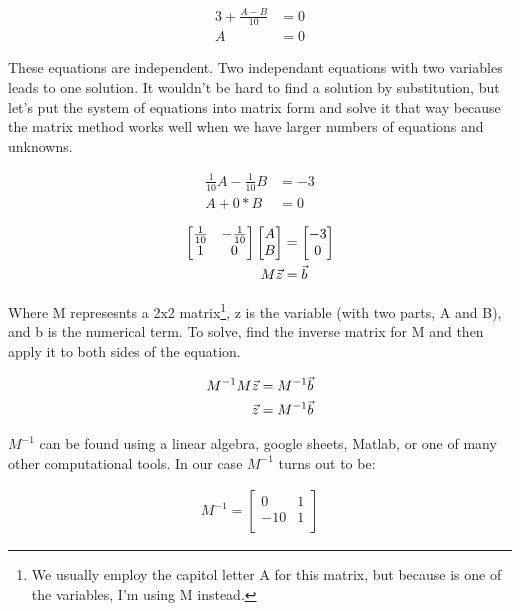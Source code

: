 \begin{align}
3 + \frac{A-B}{10}&=0\tag{Node B}\\
A&=0 \tag{Assign reference node}
\end{align} 

These equations are independent. Two independant equations with two variables leads to one solution. It wouldn't be hard to find a solution by substitution, but let's put the system of equations into matrix form and solve it that way because the matrix method works well when we have larger numbers of equations and unknowns.

\begin{align*}
\frac{1}{10}A-\frac{1}{10}B&=-3\\
A+0*B&=0
\end{align*}

\begin{align}
\left[ \begin{matrix}
\frac{1}{10} &	-\frac{1}{10}\\
1		&	0 \\
\end{matrix} \right]
\left[ \begin{matrix} A\\B\\ \end{matrix} \right]
&=
\left[ \begin{matrix}-3\\0\\\end{matrix} \right] \notag \\
M\vec{z}&=\vec{b}
\end{align} 

Where M represesnts a 2x2 matrix\footnote{We usually employ the capitol letter A for this matrix, but because is one of the variables, I'm using M instead.}, z is the variable (with two parts, A and B), and b is the numerical term. To solve, find the inverse matrix for M and then apply it to both sides of the equation.

\begin{align}
M^{-1}M\vec{z}=M^{-1}\vec{b} \notag\\
\vec{z} = M^{-1}\vec{b}
\end{align} 

$M^{-1}$ can be found using a linear algebra, google sheets, Matlab, or one of many other computational tools. In our case $M^{-1}$ turns out to be:


\begin{align*}
M^{-1}=\left[ \begin{matrix}
0 &	1\\
-10		&	1 \\
\end{matrix} \right]
\end{align*} 

